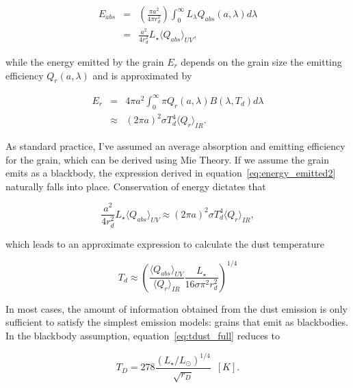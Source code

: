     \begin{eqnarray}\label{eq:energy_absorbed}
    E_{abs} &=& \left(\frac{\pi a^2}{4\pi r_d^2}\right) \int_0^\infty L_{\lambda} Q_{abs}(a,\lambda) d\lambda \\
            &=&  \frac{a^2}{4r_d^2}L_\star \langle Q_{abs}\rangle_{UV}, 
    \end{eqnarray}
    
    \noindent while the energy emitted by the grain $E_{r}$ depends on the grain size the emitting efficiency $Q_{r}(a,\lambda)$ and is approximated by
    
    \begin{eqnarray}
    E_{r} &=& 4\pi a^2 \int_0^\infty \pi Q_{r}(a,\lambda) B(\lambda,T_d)  d\lambda \label{eq:energy_emitted1}\\
          & \approx & \left(2\pi a\right)^2 \sigma T_d^4 \langle Q_{r}\rangle_{IR}. \label{eq:energy_emitted2}
    \end{eqnarray}
            
    
    \noindent As standard practice, I've assumed an average absorption and emitting efficiency for the grain, which can be derived using Mie Theory. If we assume the grain emits as a blackbody, the expression derived in equation~\ref{eq:energy_emitted2} naturally falls into place. Conservation of energy dictates that
            
            
    \begin{equation}\label{eq:conserve_energy} 
     \frac{a^2}{4r_d^2}L_\star \langle Q_{abs}\rangle_{UV} \approx \left(2\pi a\right)^2 \sigma T_d^4 \langle Q_{r}\rangle_{IR},
    \end{equation}
            
    \noindent which leads to an approximate expression to calculate the dust temperature
    
    \begin{equation}\label{eq:tdust_full}
    T_d \approx \left(\frac{\langle Q_{abs} \rangle_{UV}}{\langle Q_{r}\rangle_{IR}} \frac{L_\star}{16\sigma \pi^2 r_d^2}\right)^{1/4}
    \end{equation}
        
    In most cases, the amount of information obtained from the dust emission is only sufficient to satisfy the simplest emission models: grains that emit as blackbodies. In the blackbody assumption, equation~\ref{eq:tdust_full} reduces to 
            
    \begin{equation}\label{eq:blackbody_temp}
            T_D = 278 \frac{\left(L_\star/L_\odot \right)^{1/4}}{\sqrt{r_D}}\enspace [K]. 
    \end{equation}
    
